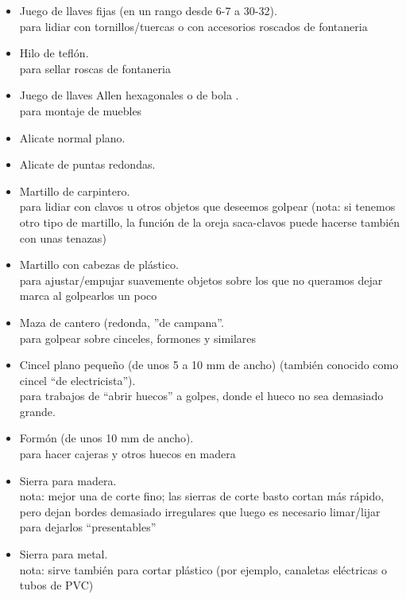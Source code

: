 \documentclass[spanish,10pt,a4paper,final,oneside]{article}
\begin{document}
\begin{itemize}
\item Juego de llaves fijas (en un rango desde 6-7 a 30-32).
\\para lidiar con tornillos/tuercas o con accesorios roscados de fontaneria

\item Hilo de teflón.
\\para sellar roscas de fontaneria

\item Juego de llaves Allen hexagonales o de bola .
\\para montaje de muebles

\item Alicate normal plano.

\item Alicate de puntas redondas.

\item Martillo de carpintero.
\\para lidiar con clavos u otros objetos que deseemos golpear (nota: si tenemos otro tipo de martillo, la función de la oreja saca-clavos puede hacerse también con unas tenazas)

\item Martillo con cabezas de plástico.
\\para ajustar/empujar suavemente objetos sobre los que no queramos dejar marca al golpearlos un poco

\item Maza de cantero (redonda, ''de campana''.
\\para golpear sobre cinceles, formones y similares

\item Cincel plano pequeño (de unos 5 a 10 mm de ancho) (también conocido como cincel ``de electricista'').
\\para trabajos de ``abrir huecos'' a golpes, donde el hueco no sea demasiado grande.

\item Formón (de unos 10 mm de ancho).
\\para hacer cajeras y otros huecos en madera

\item Sierra para madera.
\\nota: mejor una de corte fino; las sierras de corte basto cortan más rápido, pero dejan bordes demasiado irregulares que luego es necesario limar/lijar para dejarlos ``presentables''

\item Sierra para metal.
\\nota: sirve también para cortar plástico (por ejemplo, canaletas eléctricas o tubos de PVC) 


\end{itemize}
\end{document}

